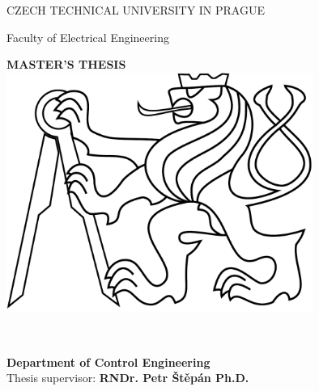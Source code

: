 \begin{titlepage}
\begin{center}

{\Large CZECH TECHNICAL UNIVERSITY IN PRAGUE}
\vskip 10pt

\vskip 8pt
{\Large Faculty of Electrical Engineering}
 
\vspace{50pt}
{\Huge\bf MASTER'S THESIS}\\
\vspace{40pt}
\includegraphics[width=10cm]{fig/lev.pdf}

\vspace{40pt}
{\Large\rm \Author } \\
\vspace{20pt}
{\Large\bf \Title}

\vspace{60pt}
{\bf Department of Control Engineering}\\
\vspace{5pt}   
{Thesis supervisor: {\bf RNDr. Petr Štěpán Ph.D.}}

\vspace{30pt}
\end{center}
\end{titlepage}
